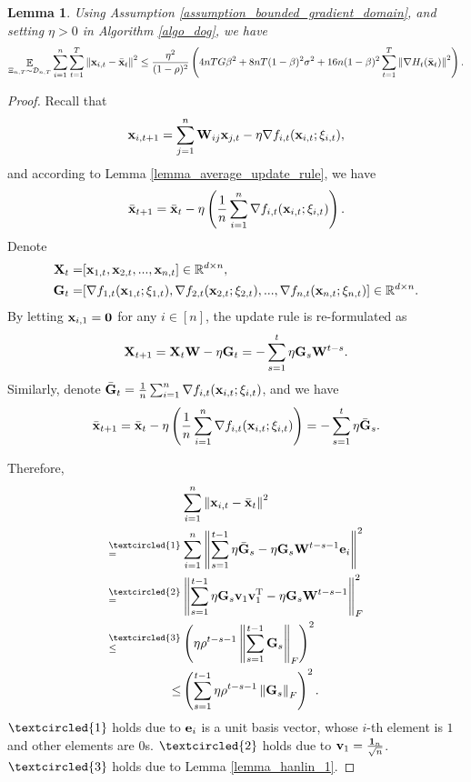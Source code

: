 \documentclass{article}
\newtheorem{Lemma}{\bf{Lemma}}
\begin{document}
\begin{Lemma}
\label{lemma_x_variance_norm_square}
Using Assumption \ref{assumption_bounded_gradient_domain}, and setting $\eta>0$ in Algorithm \ref{algo_dog}, we have 
\begin{align}
\nonumber
\mathop{\mathbb{E}}_{ \Xi_{n,T} \sim \mathcal{D}_{n,T} } \sum_{i=1}^n\sum_{t=1}^T \left\lVert{\bf x}_{i,t} - \bar{{\bf x}}_t\right\rVert^2 \le \frac{\eta^2}{(1-\rho)^2} \left(  4nTG\beta^2  +  8nT(1-\beta)^2 \sigma^2 + 16n(1-\beta)^2 \sum_{t=1}^T \left\lVert\nabla H_t(\bar{{\bf x}}_t)\right\rVert^2  \right).
\end{align}

\end{Lemma}
\begin{proof}


Recall that 
\begin{align}
\nonumber
{\bf x}_{i,t+1} = \sum_{j=1}^n {\bf W}_{ij}{\bf x}_{j,t} - \eta \nabla f_{i,t}({\bf x}_{i,t};\xi_{i,t}), 
\end{align} and according to Lemma \ref{lemma_average_update_rule}, we have 
\begin{align}
\nonumber
\bar{{\bf x}}_{t+1} = \bar{{\bf x}}_t - \eta \left( \frac{1}{n}\sum_{i=1}^n \nabla f_{i,t}({\bf x}_{i,t};\xi_{i,t}) \right).
\end{align} Denote 
\begin{align}
\nonumber
{\bf X}_t = &  [{\bf x}_{1,t}, {\bf x}_{2,t}, ..., {\bf x}_{n,t}] \in \mathbb{R}^{d\times n}, \\ \nonumber
{\bf G}_t = & [\nabla f_{1,t}({\bf x}_{1,t};\xi_{1,t}), \nabla f_{2,t}({\bf x}_{2,t};\xi_{2,t}), ..., \nabla f_{n,t}({\bf x}_{n,t};\xi_{n,t})] \in \mathbb{R}^{d\times n}.
\end{align} By letting ${\bf x}_{i,1} = {\bf 0}$ for any $i\in[n]$, the update rule is re-formulated as 
\begin{align}
\nonumber
{\bf X}_{t+1} = {\bf X}_t {\bf W} - \eta {\bf G}_t = - \sum_{s=1}^t \eta {\bf G}_s {\bf W}^{t-s}. 
\end{align} Similarly, denote $\bar{{\bf G}}_t = \frac{1}{n}\sum_{i=1}^n \nabla f_{i,t}({\bf x}_{i,t};\xi_{i,t})$, and we have
\begin{align}
\bar{{\bf x}}_{t+1} = \bar{{\bf x}}_t - \eta \left( \frac{1}{n}\sum_{i=1}^n \nabla f_{i,t}({\bf x}_{i,t};\xi_{i,t}) \right) = - \sum_{s=1}^t \eta \bar{{\bf G}}_s. 
\end{align}


Therefore, 
\begin{align}
\nonumber
& \sum_{i=1}^n \lrnorm{\x_{i,t} - \bar{\x}_t}^2 \\ \nonumber
\refabovecir{=}{\textcircled{1}} & \sum_{i=1}^n \lrnorm{ \sum_{s=1}^{t-1} \eta \bar{\G}_s - \eta \G_s \W^{t-s-1}\e_i }^2   \\ \nonumber
\refabovecir{=}{\textcircled{2}} & \lrnorm{ \sum_{s=1}^{t-1} \eta \G_s\v_1 \v_1\Tr - \eta \G_s \W^{t-s-1} }^2_F   \\ \nonumber
\refabovecir{\le}{\textcircled{3}} & \lrincir{ \eta \rho^{t-s-1} \lrnorm{\sum_{s=1}^{t-1}\G_s}_F}^2 \\ \nonumber
\le & \lrincir{ \sum_{s=1}^{t-1} \eta \rho^{t-s-1} \lrnorm{\G_s}_F}^2.
\end{align} $\textcircled{1}$ holds due to ${\bf e}_i$ is a unit basis vector, whose $i$-th element is $1$ and other elements are $0$s. $\textcircled{2}$ holds due to ${\bf v}_1 = \frac{{\bf 1}_n}{\sqrt{n}}$. $\textcircled{3}$ holds due to Lemma \ref{lemma_hanlin_1}. 



\end{proof}
\end{document}
